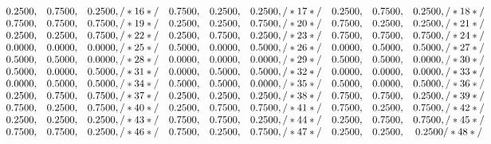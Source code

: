 \begin{itemize}
\begin{enumerate}
\begin{displaymath}
\begin{matrix}
 	\hspace*{-78pt}     0.2500, & 0.7500, & 0.2500, /*    16  */\quad 0.7500, & 0.2500, & 0.2500, /*    17  */\quad 0.2500, & 0.7500, & 0.2500, /*    18  */\\
 	\hspace*{-78pt}     0.7500, & 0.7500, & 0.7500, /*    19  */\quad 0.2500, & 0.2500, & 0.7500, /*    20  */\quad 0.7500, & 0.2500, & 0.2500, /*    21  */\\
 	\hspace*{-78pt}     0.2500, & 0.2500, & 0.7500, /*    22  */\quad 0.2500, & 0.7500, & 0.2500, /*    23  */\quad 0.7500, & 0.7500, & 0.7500, /*    24  */\\
 	\hspace*{-78pt}     0.0000, & 0.0000, & 0.0000, /*    25  */\quad 0.5000, & 0.0000, & 0.5000, /*    26  */\quad 0.0000, & 0.5000, & 0.5000, /*    27  */\\
 	\hspace*{-78pt}     0.5000, & 0.5000, & 0.0000, /*    28  */\quad 0.0000, & 0.0000, & 0.0000, /*    29  */\quad 0.5000, & 0.5000, & 0.0000, /*    30  */\\
 	\hspace*{-78pt}     0.5000, & 0.0000, & 0.5000, /*    31  */\quad 0.0000, & 0.5000, & 0.5000, /*    32  */\quad 0.0000, & 0.0000, & 0.0000, /*    33  */\\
 	\hspace*{-78pt}     0.0000, & 0.5000, & 0.5000, /*    34  */\quad 0.5000, & 0.5000, & 0.0000, /*    35  */\quad 0.5000, & 0.0000, & 0.5000, /*    36  */\\
 	\hspace*{-78pt}     0.2500, & 0.7500, & 0.7500, /*    37  */\quad 0.2500, & 0.2500, & 0.2500, /*    38  */\quad 0.7500, & 0.7500, & 0.2500, /*    39  */\\
 	\hspace*{-78pt}     0.7500, & 0.2500, & 0.7500, /*    40  */\quad 0.2500, & 0.7500, & 0.7500, /*    41  */\quad 0.7500, & 0.2500, & 0.7500, /*    42  */\\
 	\hspace*{-78pt}     0.2500, & 0.2500, & 0.2500, /*    43  */\quad 0.7500, & 0.7500, & 0.2500, /*    44  */\quad 0.2500, & 0.7500, & 0.7500, /*    45  */\\
 	\hspace*{-78pt}     0.7500, & 0.7500, & 0.2500, /*    46  */\quad 0.7500, & 0.2500, & 0.7500, /*    47  */\quad 0.2500, & 0.2500, & 0.2500  /*    48  */\\

\end{matrix}
\end{displaymath}
\end{enumerate}
\end{itemize}
